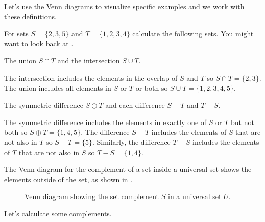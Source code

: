 Let's use the Venn diagrams to visualize specific examples and we work with these definitions.

\begin{exam}
\label{exam_setops}
    For sets $S = \{2,3,5\}$ and $T = \{1,2,3,4\}$ calculate the following sets.  You might want to look back at .
        \begin{apart}
            \item The union $S \cap T$ and the intersection $S \cup T$.
                \begin{soln}
                    The intersection includes the elements in the overlap of $S$ and $T$ so $S \cap T = \{2,3\}$. The union includes all elements in $S$ or $T$ or both so $S \cup T = \{1,2,3,4,5\}$.
                \end{soln}
            \item The symmetric difference $S \oplus T$ and each difference $S-T$ and $T-S$.
                \begin{soln}
                    The symmetric difference includes the elements in exactly one of $S$ or $T$ but not both so $S \oplus T = \{1,4,5\}$. The difference $S-T$ includes the elements of $S$ that are not also in $T$ so $S-T = \{5\}$. Similarly, the difference $T-S$ includes the elements of $T$ that are not also in $S$ so $T-S = \{1,4\}$.
                \end{soln}
        \end{apart}
\end{exam}

The Venn diagram for the complement of a set inside a universal set shows the elements outside of the set, as shown in .

\begin{figure}[hbtp]
    \centering
    
    \caption{Venn diagram showing the set complement $\overline{S}$ in a universal set $U$.}
    \label{fig_venn_complement}
\end{figure}

Let's calculate some complements.


